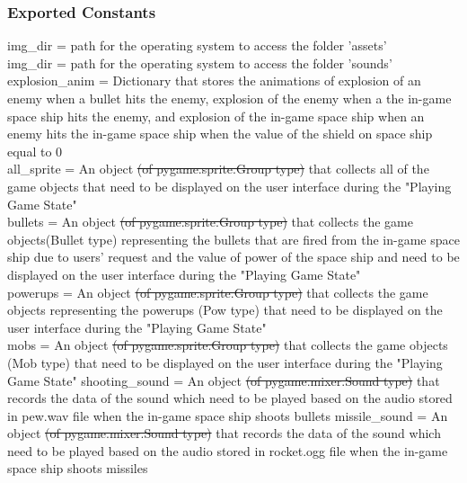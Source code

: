 \documentclass[12pt, titlepage]{article}
\begin{document}
\subsubsection*{Exported Constants}
 img\_dir = path for the operating system to access the folder 'assets' \\
\newline
 img\_dir = path for the operating system to access the folder 'sounds' \\
\newline
 explosion\_anim = Dictionary that stores the animations of explosion of an enemy when a bullet hits the enemy, explosion of the enemy when a the in-game space ship hits the enemy, and explosion of the in-game space ship when an enemy hits the in-game space ship when the value of the shield on space ship equal to 0\\
\newline
 all\_sprite = An object \sout{(of pygame.sprite.Group type)} that collects all of the game objects that need to be displayed on the user interface during the "Playing Game State"\\
\newline
 bullets = An object \sout{(of pygame.sprite.Group type)} that collects the game objects(Bullet type) representing the bullets that are fired from the in-game space ship due to users' request and the value of power of the space ship and need to be displayed on the user interface during the "Playing Game State"\\
\newline
 powerups = An object \sout{(of pygame.sprite.Group type)} that collects the game objects representing the powerups (Pow type) that need to be displayed on the user interface during the "Playing Game State"\\
\newline
 mobs = An object \sout{(of pygame.sprite.Group type)} that collects the game objects (Mob type) that need to be displayed on the user interface during the "Playing Game State"
\newline 
shooting\_sound = An object \sout{(of pygame.mixer.Sound type)} that records the data of the sound which need to be played based on the audio stored in pew.wav file when the in-game space ship shoots bullets  
\newline
missile\_sound = An object \sout{(of pygame.mixer.Sound type)} that records the data of the sound which need to be played based on the audio stored in rocket.ogg file when the in-game space ship shoots missiles \\
\end{document}

